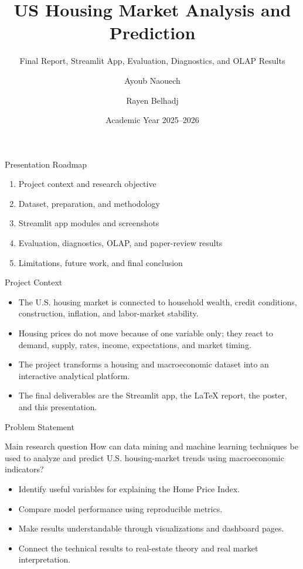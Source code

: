 \documentclass[aspectratio=169]{beamer}
\title[US Housing Intelligence]{US Housing Market Analysis and Prediction}
\subtitle{Final Report, Streamlit App, Evaluation, Diagnostics, and OLAP Results}
\author{Ayoub Naouech \and Rayen Belhadj}
\institute{IT Business School -- Data Mining and Machine Learning}
\date{Academic Year 2025--2026}
\begin{document}
\begin{frame}
  \titlepage
\end{frame}

\begin{frame}{Presentation Roadmap}
\begin{enumerate}
  \item Project context and research objective
  \item Dataset, preparation, and methodology
  \item Streamlit app modules and screenshots
  \item Evaluation, diagnostics, OLAP, and paper-review results
  \item Limitations, future work, and final conclusion
\end{enumerate}
\end{frame}

\begin{frame}{Project Context}
\begin{itemize}
  \item The U.S. housing market is connected to household wealth, credit conditions, construction, inflation, and labor-market stability.
  \item Housing prices do not move because of one variable only; they react to demand, supply, rates, income, expectations, and market timing.
  \item The project transforms a housing and macroeconomic dataset into an interactive analytical platform.
  \item The final deliverables are the Streamlit app, the LaTeX report, the poster, and this presentation.
\end{itemize}
\end{frame}

\begin{frame}{Problem Statement}
\begin{block}{Main research question}
How can data mining and machine learning techniques be used to analyze and predict U.S. housing-market trends using macroeconomic indicators?
\end{block}
\begin{itemize}
  \item Identify useful variables for explaining the Home Price Index.
  \item Compare model performance using reproducible metrics.
  \item Make results understandable through visualizations and dashboard pages.
  \item Connect the technical results to real-estate theory and real market interpretation.
\end{itemize}
\end{frame}
\end{document}
